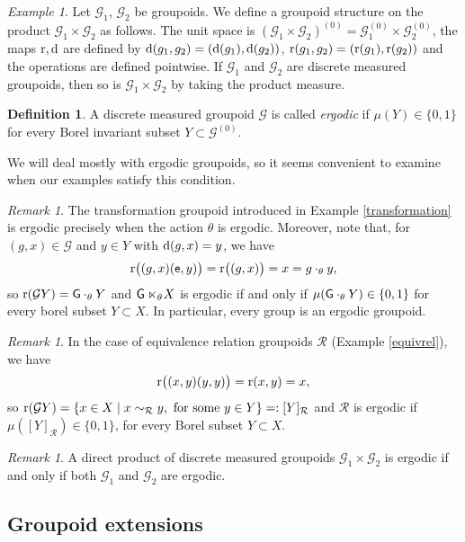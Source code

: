 \documentclass[a4paper,11pt]{article}
\numberwithin{equation}{section}
\theoremstyle{definition}
\newtheorem{defn}[thm]{Definition}
\theoremstyle{remark}
\newtheorem{rem}[thm]{Remark}
\newtheorem{ex}[thm]{Example}
\numberwithin{equation}{section}
\newcommand{\rG}{\mathcal{G}}
\def\e{{\sf e}}
\def\r{{\rm r}}
\def\d{{\rm d}}
\def\G{{\sf G}}
\numberwithin{equation}{section}
\begin{document}
\begin{ex}\label{prodgrpds}
  Let $ \rG_{1} $, $ \rG_{2} $ be groupoids. We define a groupoid structure on the product $ \rG_{1}\times \rG_{2} $ as follows. The unit space is $ (\rG_{1}\times\rG_{2})^{(0)} = \rG_{1}^{(0)}\times\rG_{2}^{(0)} $, the maps $\r,\d$ are defined by $ \d(g_{1},g_{2}) = (\d(g_{1}),\d(g_{2})) $, $ \r(g_{1},g_{2}) = (\r(g_{1}),\r(g_{2})) $ and the operations are defined pointwise. If $ \rG_{1} $ and $ \rG_{2} $ are discrete measured groupoids, then so is $ \rG_{1}\times \rG_{2} $ by taking the product measure.
\end{ex}

\begin{defn}
    A discrete measured groupoid $\rG$ is called {\it ergodic} if $\mu(Y)\in\{0,1\}$ for every Borel invariant subset $Y\subset \rG^{(0)}$.
\end{defn}

We will deal mostly with ergodic groupoids, so it seems convenient to examine when our examples satisfy this condition.

\begin{rem}
The transformation groupoid introduced in Example \ref{transformation} is ergodic precisely when the action $\theta$ is ergodic. Moreover, note that, for $(g,x)\in \rG$ and $y\in Y$ with $\d(g,x)=y$, we have 
$$
\r\big((g,x)(\e,y)\big)=\r\big((g,x)\big)=x=g\cdot_\theta y, 
$$
so $\r(\rG Y)=\G\cdot_\theta Y$ and $\G\ltimes_\theta\!X$ is ergodic if and only if $\mu(\G\cdot_\theta Y)\in\{0,1\}$ for every borel subset $Y\subset X$. In particular, every group is an ergodic groupoid.
\end{rem}

\begin{rem}
In the case of equivalence relation groupoids $\mathcal R$ (Example \ref{equivrel}), we have $$
\r\big((x,y)(y,y)\big)=\r(x,y)=x, 
$$
so $\r(\rG Y)=\{x\in X\mid x\sim_{\mathcal R} y,\textup{ for some }y\in Y\}=: [Y]_{\mathcal R}$ and $\mathcal R$ is ergodic if $\mu([Y]_{\mathcal R})\in\{0,1\} $, for every Borel subset $Y\subset X$.

\end{rem}

\begin{rem}
A direct product of discrete measured groupoids $\rG_1\times \rG_2$ is ergodic if and only if both $\rG_1$ and $\rG_2$ are ergodic. 
\end{rem}

\subsection{Groupoid extensions}
\end{document}
